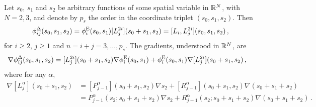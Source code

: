 \begin{definition*}
Let $s_0$, $s_1$ and $s_2$ be arbitrary functions of some spatial variable in $\mathbb{R}^N$, with $N=2,3$, and denote by $p_s$ the order in the coordinate triplet $(s_0,s_1,s_2)$. Then
\begin{equation}
    \phi_{ij}^\Delta(s_0,s_1,s_2)=\phi_i^{\mathrm{E}}(s_0,s_1)[L_j^{2i}](s_0+s_1,s_2)=[L_i,L_j^{2i}](s_0,s_1,s_2)\,,
\end{equation}
for $i\geq2$, $j\geq1$ and $n=i+j=3,\ldots,p_s$. %
The gradients, understood in $\mathbb{R}^N$, are
\begin{equation}
    \begin{aligned}
    \nabla\phi_{ij}^\Delta(s_0,s_1,s_2)&=[L_j^{2i}](s_0+s_1,s_2)\nabla\phi_i^{\mathrm{E}}(s_0,s_1)
    	+\phi_i^{\mathrm{E}}(s_0,s_1)\nabla[L_j^{2i}](s_0+s_1,s_2)\,,
    \end{aligned}
\end{equation}
where for any $\alpha$,
\begin{equation}	
	\begin{aligned}
  	\nabla[L_j^\alpha](s_0\!+\!s_1,s_2)&=[P_{j-1}^\alpha](s_0\!+\!s_1,s_2)\nabla s_2
  		+[R_{j-1}^\alpha](s_0\!+\!s_1,s_2)\nabla(s_0\!+\!s_1\!+\!s_2)\\
        &=P_{j-1}^\alpha(s_2;s_0\!+\!s_1\!+\!s_2)\nabla s_2
        		+R_{j-1}^\alpha(s_2;s_0\!+\!s_1\!+\!s_2)\nabla(s_0\!+\!s_1\!+\!s_2)\,.
  \end{aligned}\label{eq:DerivativeofLalpha}
\end{equation}
\end{definition*}



